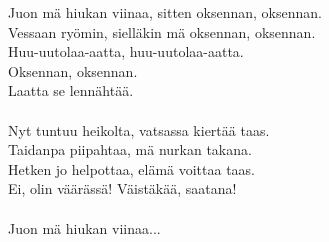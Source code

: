 
            Juon mä hiukan viinaa, sitten oksennan, oksennan. \\
            Vessaan ryömin, sielläkin mä oksennan, oksennan. \\
            Huu-uutolaa-aatta, huu-uutolaa-aatta. \\
            Oksennan, oksennan. \\
            Laatta se lennähtää. \\
\hspace{10mm} \\
            Nyt tuntuu heikolta, vatsassa kiertää taas. \\
            Taidanpa piipahtaa, mä nurkan takana. \\
            Hetken jo helpottaa, elämä voittaa taas. \\
            Ei, olin väärässä! Väistäkää, saatana! \\
\hspace{10mm} \\
            Juon mä hiukan viinaa... \\
